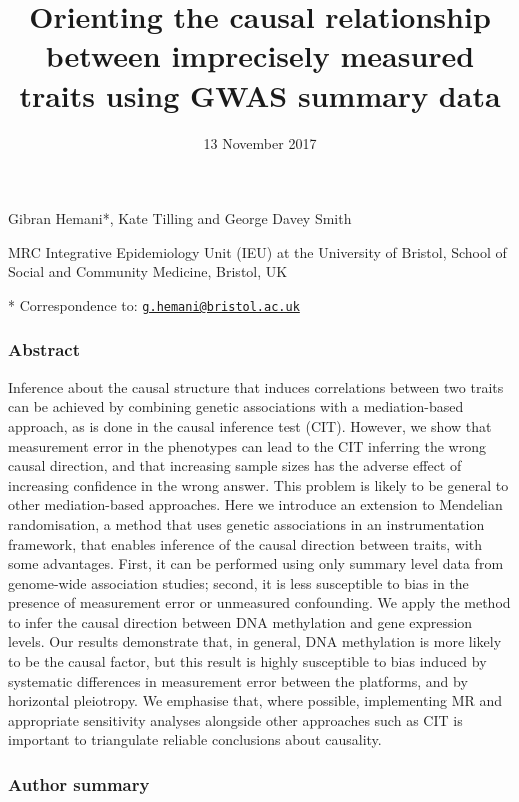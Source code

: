 \documentclass[]{article}
\title{Orienting the causal relationship between imprecisely measured traits
using GWAS summary data}
\author{}
\date{13 November 2017}
\begin{document}
\maketitle

Gibran Hemani*, Kate Tilling and George Davey Smith

MRC Integrative Epidemiology Unit (IEU) at the University of Bristol,
School of Social and Community Medicine, Bristol, UK

* Correspondence to:
\href{mailto:g.hemani@bristol.ac.uk}{\nolinkurl{g.hemani@bristol.ac.uk}}

\subsubsection{Abstract}\label{abstract}

Inference about the causal structure that induces correlations between
two traits can be achieved by combining genetic associations with a
mediation-based approach, as is done in the causal inference test (CIT).
However, we show that measurement error in the phenotypes can lead to
the CIT inferring the wrong causal direction, and that increasing sample
sizes has the adverse effect of increasing confidence in the wrong
answer. This problem is likely to be general to other mediation-based
approaches. Here we introduce an extension to Mendelian randomisation, a
method that uses genetic associations in an instrumentation framework,
that enables inference of the causal direction between traits, with some
advantages. First, it can be performed using only summary level data
from genome-wide association studies; second, it is less susceptible to
bias in the presence of measurement error or unmeasured confounding. We
apply the method to infer the causal direction between DNA methylation
and gene expression levels. Our results demonstrate that, in general,
DNA methylation is more likely to be the causal factor, but this result
is highly susceptible to bias induced by systematic differences in
measurement error between the platforms, and by horizontal pleiotropy.
We emphasise that, where possible, implementing MR and appropriate
sensitivity analyses alongside other approaches such as CIT is important
to triangulate reliable conclusions about causality.

\subsubsection{Author summary}\label{author-summary}
\end{document}

